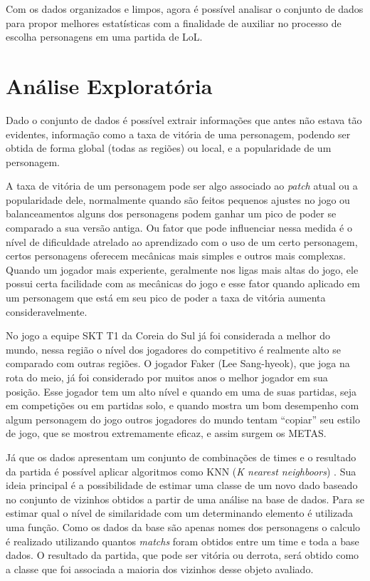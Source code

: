 \documentclass[a4paper]{article}
\begin{document}
Com os dados organizados e limpos, agora é possível analisar o conjunto de dados para propor melhores estatísticas com a finalidade de auxiliar no processo de escolha personagens em uma partida de LoL.

\section{Análise Exploratória}


Dado o conjunto de dados é possível extrair informações que antes não estava tão evidentes, informação como a taxa de vitória de uma personagem, podendo ser obtida de forma global (todas as regiões) ou local, e a popularidade de um personagem.

A taxa de vitória de um personagem pode ser algo associado ao \textit{patch} atual ou a popularidade dele, normalmente quando são feitos pequenos ajustes no jogo ou balanceamentos alguns dos personagens podem ganhar um pico de poder se comparado a sua versão antiga. Ou fator que pode influenciar nessa medida é o nível de dificuldade atrelado ao aprendizado com o uso de um certo personagem, certos personagens oferecem mecânicas mais simples e outros mais complexas. Quando um jogador mais experiente, geralmente nos ligas mais altas do jogo, ele possui certa facilidade com as mecânicas do jogo e esse fator quando aplicado em um personagem que está em seu pico de poder a taxa de vitória aumenta consideravelmente. 

No jogo a equipe SKT T1 da Coreia do Sul já foi considerada a melhor do mundo, nessa região o nível dos jogadores do competitivo é realmente alto se comparado com outras regiões. O jogador Faker (Lee Sang-hyeok), que joga na rota do meio, já foi considerado por muitos anos o melhor jogador em sua posição. Esse jogador tem um alto nível e quando em uma de suas partidas, seja em competições ou em partidas solo, e quando mostra um bom desempenho com algum personagem do jogo outros jogadores do mundo tentam “copiar” seu estilo de jogo, que se mostrou extremamente eficaz, e assim surgem os METAS.


Já que os dados apresentam um conjunto de combinações de times e o resultado da partida é possível aplicar algoritmos como KNN (\textit{K nearest neighboors}) \cite{fukunaga1975branch}. Sua ideia principal é a possibilidade de estimar uma classe de um novo dado baseado no conjunto de vizinhos obtidos a partir de uma análise na base de dados. Para se estimar qual o nível de similaridade com um determinando elemento é utilizada uma função. Como os dados da base são apenas nomes dos personagens o calculo é realizado utilizando quantos \textit{matchs} foram obtidos entre um time e toda a base dados. O resultado da partida, que pode ser vitória ou derrota, será obtido como a classe que foi associada a maioria dos vizinhos desse objeto avaliado. 
\end{document}
